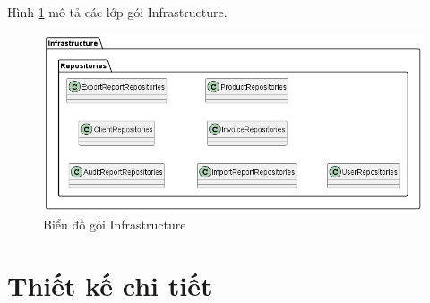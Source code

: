 \documentclass[../DoAn.tex]{subfiles}
\begin{document}
Hình \ref{fig:systemdesign-package-server-infrastructure} mô tả các lớp gói Infrastructure.
\begin{figure}[H]
    \centering
    \includegraphics[width=1\textwidth]{Hinhve/design/package/server/Infrastructure}
    \caption{Biểu đồ gói Infrastructure}
    \label{fig:systemdesign-package-server-infrastructure}
\end{figure}
\break


\section{Thiết kế chi tiết}
\label{section:detaildesign}
\end{document}
